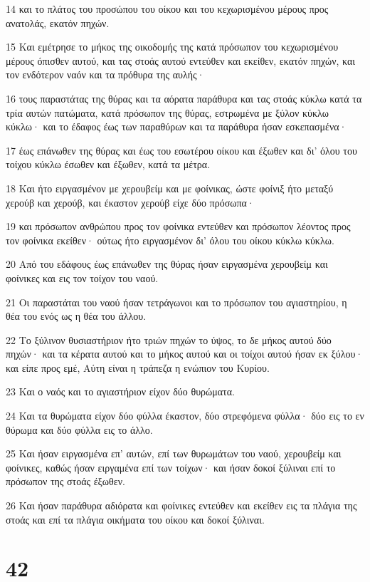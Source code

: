 \par 14 και το πλάτος του προσώπου του οίκου και του κεχωρισμένου μέρους προς ανατολάς, εκατόν πηχών.
\par 15 Και εμέτρησε το μήκος της οικοδομής της κατά πρόσωπον του κεχωρισμένου μέρους όπισθεν αυτού, και τας στοάς αυτού εντεύθεν και εκείθεν, εκατόν πηχών, και τον ενδότερον ναόν και τα πρόθυρα της αυλής·
\par 16 τους παραστάτας της θύρας και τα αόρατα παράθυρα και τας στοάς κύκλω κατά τα τρία αυτών πατώματα, κατά πρόσωπον της θύρας, εστρωμένα με ξύλον κύκλω κύκλω· και το έδαφος έως των παραθύρων και τα παράθυρα ήσαν εσκεπασμένα·
\par 17 έως επάνωθεν της θύρας και έως του εσωτέρου οίκου και έξωθεν και δι' όλου του τοίχου κύκλω έσωθεν και έξωθεν, κατά τα μέτρα.
\par 18 Και ήτο ειργασμένον με χερουβείμ και με φοίνικας, ώστε φοίνιξ ήτο μεταξύ χερούβ και χερούβ, και έκαστον χερούβ είχε δύο πρόσωπα·
\par 19 και πρόσωπον ανθρώπου προς τον φοίνικα εντεύθεν και πρόσωπον λέοντος προς τον φοίνικα εκείθεν· ούτως ήτο ειργασμένον δι' όλου του οίκου κύκλω κύκλω.
\par 20 Από του εδάφους έως επάνωθεν της θύρας ήσαν ειργασμένα χερουβείμ και φοίνικες και εις τον τοίχον του ναού.
\par 21 Οι παραστάται του ναού ήσαν τετράγωνοι και το πρόσωπον του αγιαστηρίου, η θέα του ενός ως η θέα του άλλου.
\par 22 Το ξύλινον θυσιαστήριον ήτο τριών πηχών το ύψος, το δε μήκος αυτού δύο πηχών· και τα κέρατα αυτού και το μήκος αυτού και οι τοίχοι αυτού ήσαν εκ ξύλου· και είπε προς εμέ, Αύτη είναι η τράπεζα η ενώπιον του Κυρίου.
\par 23 Και ο ναός και το αγιαστήριον είχον δύο θυρώματα.
\par 24 Και τα θυρώματα είχον δύο φύλλα έκαστον, δύο στρεφόμενα φύλλα· δύο εις το εν θύρωμα και δύο φύλλα εις το άλλο.
\par 25 Και ήσαν ειργασμένα επ' αυτών, επί των θυρωμάτων του ναού, χερουβείμ και φοίνικες, καθώς ήσαν ειργαμένα επί των τοίχων· και ήσαν δοκοί ξύλιναι επί το πρόσωπον της στοάς έξωθεν.
\par 26 Και ήσαν παράθυρα αδιόρατα και φοίνικες εντεύθεν και εκείθεν εις τα πλάγια της στοάς και επί τα πλάγια οικήματα του οίκου και δοκοί ξύλιναι.

\chapter{42}


